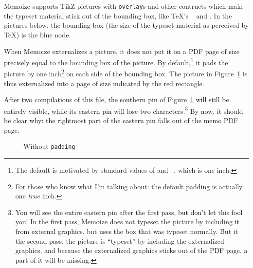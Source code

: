 \documentclass{article}
\begin{document}
Memoize supports TikZ pictures with {\tt overlay}s and other contructs which
make the typeset material stick out of the bounding box, like \TeX's {\tt
  \string\llap} and {\tt \string\rlap}.  In the pictures below, the bounding
box (the size of the typeset material as perceived by \TeX) is the blue node.

When Memoize externalizes a picture, it does not put it on a PDF page of size
precisely equal to the bounding box of the picture.  By default,\footnote{The
  default is motivated by standard values of {\tt \string\pdfhorigin} and {\tt
    \string\pdfvorigin}, which is one inch.} it pads the picture by one
inch\footnote{For those who know what I'm talking about: the default padding is
  actually one \emph{true} inch.} on each side of the bounding box.  The
picture in Figure~\ref{fig:without-padding} is thus externalized into a page of
size indicated by the red rectangle.

After two compilations of this file, the southern pin of
Figure~\ref{fig:without-padding} will still be entirely visible, while its
eastern pin will lose two characters.\footnote{You will see the entire eastern
  pin after the first pass, but don't let this fool you!  In the first pass,
  Memoize does not typeset the picture by including it from external graphics,
  but uses the box that was typeset normally.  But it the second pass, the
  picture is ``typeset'' by including the externalized graphics, and because
  the externalized graphics sticks out of the PDF page, a part of it will be
  missing.} By now, it should be clear why: the rightmost part of the eastern
pin falls out of the memo PDF page.

\begin{figure}[t]
  \begin{center}
  \end{center}
  \caption{Without {\tt padding}}
  \label{fig:without-padding}
\end{figure}
\end{document}
